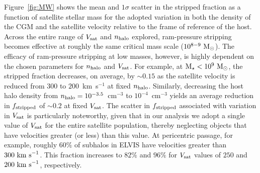 Figure~\ref{fig:MW} shows the mean and $1\sigma$ scatter in the
stripped fraction as a function of satellite stellar mass for the
adopted variation in both the density of the CGM and the satellite
velocity relative to the frame of reference of the host.
%
Across the entire range of $V_{\rm sat}$ and $n_{\rm halo}$ explored,
ram-pressure stripping becomes effective at roughly the same critical
mass scale ($10^{8-9}~{\rm M}_{\odot}$).
%
The efficacy of ram-pressure stripping at low masses, however, is
highly dependent on the chosen parameters for $n_{\rm halo}$ and
$V_{\rm sat}$.
%
For example, at ${\rm M}_{\star} < 10^{9}~{\rm M}_{\odot}$, the stripped fraction
decreases, on average, by $\sim0.15$ as the satellite velocity is
reduced from $300$ to $200$~km~s$^{-1}$ at fixed $n_{\rm halo}$.
%
Similarly, decreasing the host halo density from $n_{\rm halo} =
10^{-3.5}$~cm$^{-3}$ to $10^{-4}$~cm$^{-3}$ yields an average
reduction in $f_{\rm stripped}$ of $\sim0.2$ at fixed $V_{\rm sat}$.
%
The scatter in $f_{\rm stripped}$ associated with variation in $V_{\rm
  sat}$ is particularly noteworthy, given that in our analysis we
adopt a single value of $V_{\rm sat}$ for the entire satellite
population, thereby neglecting objects that have velocities greater
(or less) than this value. 
%
At pericentric passage, for example, roughly $60\%$ of subhalos in
ELVIS have velocities greater than $300~{\rm km~s}^{-1}$. This
fraction increases to $82\%$ and $96\%$ for $V_{\rm sat}$ values of
$250$ and $200~{\rm km~s}^{-1}$, respectively.



